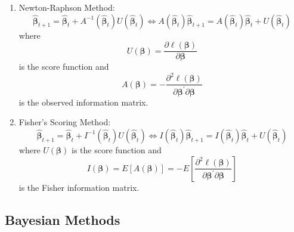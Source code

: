 \begin{enumerate}
    \item Newton-Raphson Method:
          \begin{equation}
              \hat{\boldsymbol{\beta}}_{t+1}=\hat{\boldsymbol{\beta}}_{t}+A^{-1}\left(\hat{\boldsymbol{\beta}}_{t}\right)U\left(\hat{\boldsymbol{\beta}}_{t}\right)\Leftrightarrow A\left(\hat{\boldsymbol{\beta}}_{t}\right)\hat{\boldsymbol{\beta}}_{t+1}=A\left(\hat{\boldsymbol{\beta}}_{t}\right)\hat{\boldsymbol{\beta}}_{t}+U\left(\hat{\boldsymbol{\beta}}_{t}\right)
          \end{equation}
          where
          \begin{equation}
              U\left(\boldsymbol{\beta}\right)=\frac{\partial\ell\left(\boldsymbol{\beta}\right)}{\partial\boldsymbol{\beta}}
          \end{equation}
          is the score function and
          \begin{equation}
              A\left(\boldsymbol{\beta}\right)=-\frac{\partial^{2}\ell\left(\boldsymbol{\beta}\right)}{\partial\boldsymbol{\beta}^{\prime}\partial\boldsymbol{\beta}}
          \end{equation}
          is the observed information matrix.
    \item Fisher’s Scoring Method:
          \begin{equation}
              \hat{\boldsymbol{\beta}}_{t+1}=\hat{\boldsymbol{\beta}}_{t}+I^{-1}\left(\hat{\boldsymbol{\beta}}_{t}\right)U\left(\hat{\boldsymbol{\beta}}_{t}\right)\Leftrightarrow I\left(\hat{\boldsymbol{\beta}}_{t}\right)\hat{\boldsymbol{\beta}}_{t+1}=I\left(\hat{\boldsymbol{\beta}}_{t}\right)\hat{\boldsymbol{\beta}}_{t}+U\left(\hat{\boldsymbol{\beta}}_{t}\right)
          \end{equation}
          where $U\left(\boldsymbol{\beta}\right)$ is the score function and
          \begin{equation}
              I\left(\boldsymbol{\beta}\right)=E\left[A\left(\boldsymbol{\beta}\right)\right]=-E\left[\frac{\partial^{2}\ell\left(\boldsymbol{\beta}\right)}{\partial\boldsymbol{\beta}^{\prime}\partial\boldsymbol{\beta}}\right]
          \end{equation}
          is the Fisher information matrix.
\end{enumerate}

\subsection{Bayesian Methods}
